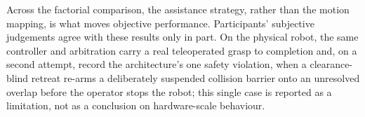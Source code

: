 Across the factorial comparison, the assistance strategy, rather than the motion mapping, is what moves objective performance. Participants' subjective judgements agree with these results only in part. On the physical robot, the same controller and arbitration carry a real teleoperated grasp to completion and, on a second attempt, record the architecture's one safety violation, when a clearance-blind retreat re-arms a deliberately suspended collision barrier onto an unresolved overlap before the operator stops the robot; this single case is reported as a limitation, not as a conclusion on hardware-scale behaviour.
